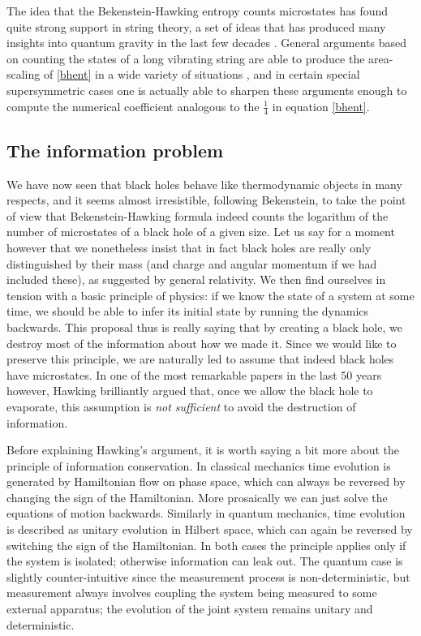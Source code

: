 \documentclass[12pt]{article}
\begin{document}
The idea that the Bekenstein-Hawking entropy counts microstates has found quite strong support in string theory, a set of ideas that has produced many insights into quantum gravity in the last few decades \cite{Polchinski:1998rq,Polchinski:1998rr}.  General arguments based on counting the states of a long vibrating string are able to produce the area-scaling of \eqref{bhent} in a wide variety of situations \cite{Susskind:1993ws,Horowitz:1996nw}, and in certain special supersymmetric cases \cite{Strominger:1996sh} one is actually able to sharpen these arguments enough to compute the numerical coefficient analogous to the $\frac{1}{4}$ in equation \eqref{bhent}.  

\subsection{The information problem}\label{infpsec}
We have now seen that black holes behave like thermodynamic objects in many respects, and it seems almost irresistible, following Bekenstein, to take the point of view that Bekenstein-Hawking formula indeed counts the logarithm of the number of microstates of a black hole of a given size.  Let us say for a moment however that we nonetheless insist that in fact black holes are really only distinguished by their mass (and charge and angular momentum if we had included these), as suggested by general relativity.  We then find ourselves in tension with a basic principle of physics: if we know the state of a system at some time, we should be able to infer its initial state by running the dynamics backwards.  This proposal thus is really saying that by creating a black hole, we destroy most of the information about how we made it.  Since we would like to preserve this principle, we are naturally led to assume that indeed black holes have microstates.  In one of the most remarkable papers in the last 50 years however, Hawking brilliantly argued that, once we allow the black hole to evaporate, this assumption is \textit{not sufficient} to avoid the destruction of information.  

Before explaining Hawking's argument, it is worth saying a bit more about the principle of information conservation.  In classical mechanics time evolution is generated by Hamiltonian flow on phase space, which can always be reversed by changing the sign of the Hamiltonian.  More prosaically we can just solve the equations of motion backwards.  Similarly in quantum mechanics, time evolution is described as unitary evolution in Hilbert space, which can again be reversed by switching the sign of the Hamiltonian.  In both cases the principle applies only if the system is isolated; otherwise information can leak out.  The quantum case is slightly counter-intuitive since the measurement process is non-deterministic, but measurement always involves coupling the system being measured to some external apparatus; the evolution of the joint system remains unitary and deterministic.  
\end{document}
